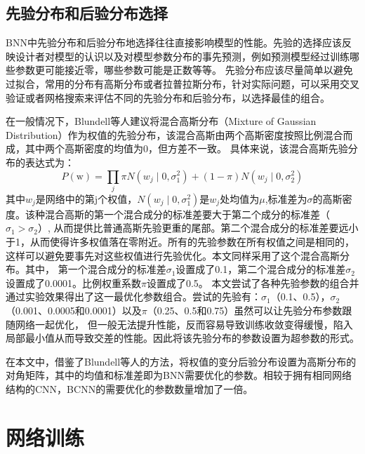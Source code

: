 \subsection{先验分布和后验分布选择}
BNN中先验分布和后验分布地选择往往直接影响模型的性能。先验的选择应该反映设计者对模型的认识以及对模型参数分布的事先预测，例如预测模型经过训练哪些参数更可能接近零，哪些参数可能是正数等等。
先验分布应该尽量简单以避免过拟合，常用的分布有高斯分布或者拉普拉斯分布，针对实际问题，可以采用交叉验证或者网格搜索来评估不同的先验分布和后验分布，以选择最佳的组合。

在一般情况下，Blundell等人\cite{blundell2015weight}建议将混合高斯分布（Mixture of Gaussian Distribution）作为权值的先验分布，该混合高斯由两个高斯密度按照比例混合而成，其中两个高斯密度的均值为0，但方差不一致。
具体来说，该混合高斯先验分布的表达式为：
\begin{equation}
	\label{}
	P(\mathrm{w})=\prod_j \pi N\left(w_j \mid 0, \sigma_1^2\right)+(1-\pi) N\left(w_j \mid 0, \sigma_2^2\right)
\end{equation}
其中$w_j$是网络中的第j个权值，$N\left(w_j \mid 0, \sigma_1^2\right)$是$w_j$处均值为$\mu$,标准差为$\sigma$的高斯密度。该种混合高斯的第一个混合成分的标准差要大于第二个成分的标准差（$\sigma_1 > \sigma_2$）,
从而提供比普通高斯先验更重的尾部。第二个混合成分的标准差要远小于1，从而使得许多权值落在零附近。所有的先验参数在所有权值之间是相同的，这样可以避免要事先对这些权值进行先验优化。本文同样采用了这个混合高斯分布。其中，
第一个混合成分的标准差$\sigma_1$设置成了0.1，第二个混合成分的标准差$\sigma_2$设置成了0.0001。比例权重系数$\pi$设置成了0.5。
本文尝试了各种先验参数的组合并通过实验效果得出了这一最优化参数组合。尝试的先验有：$\sigma_1$（0.1、0.5），$\sigma_2$（0.001、0.0005和0.0001）以及$\pi$（0.25、0.5和0.75）虽然可以让先验分布参数跟随网络一起优化，
但一般无法提升性能，反而容易导致训练收敛变得缓慢，陷入局部最小值从而导致交差的性能。因此将该先验分布的参数设置为超参数的形式。

在本文中，借鉴了Blundell等人\cite{blundell2015weight}的方法，将权值的变分后验分布设置为高斯分布的对角矩阵，其中的均值和标准差即为BNN需要优化的参数。相较于拥有相同网络结构的CNN，BCNN的需要优化的参数数量增加了一倍。


\section{网络训练}
